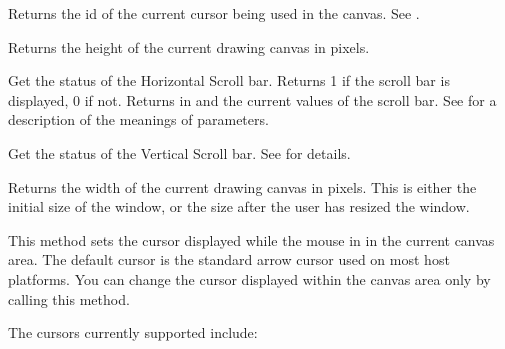 
Returns the id of the current cursor being used in the canvas.
See .


Returns the height of the current drawing canvas in pixels.


Get the status of the Horizontal Scroll bar. Returns 1 if the
scroll bar is displayed, 0 if not. Returns in  and
 the current values of the scroll bar. See 
for a description of the meanings of parameters.


Get the status of the Vertical Scroll bar. See
 for details.


Returns the width of the current drawing canvas in pixels.
This is either the initial size of the window, or the size
after the user has resized the window.


This method sets the cursor displayed while the mouse in
in the current canvas area. The default cursor is the
standard arrow cursor used on most host platforms. You
can change the cursor displayed within the canvas area
only by calling this method.

The cursors currently supported include:

